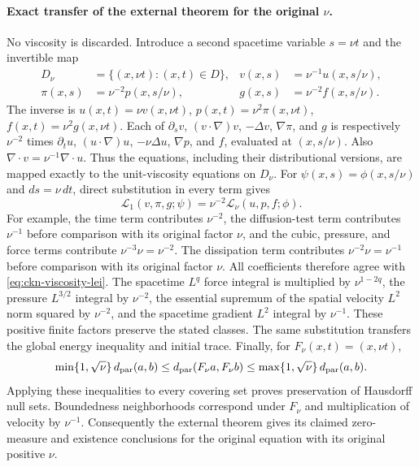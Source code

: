 \paragraph{Exact transfer of the external theorem for the original $\nu$.}
No viscosity is discarded. Introduce a second spacetime variable
$s=\nu t$ and the invertible map
\begin{equation}\label{eq:ckn-viscosity-map}
 \begin{aligned}
 D_\nu&=\{(x,\nu t):(x,t)\in D\},&
 v(x,s)&=\nu^{-1}u(x,s/\nu),\\
 \pi(x,s)&=\nu^{-2}p(x,s/\nu),&
 g(x,s)&=\nu^{-2}f(x,s/\nu).
 \end{aligned}
\end{equation}
The inverse is $u(x,t)=\nu v(x,\nu t)$,
$p(x,t)=\nu^2\pi(x,\nu t)$, $f(x,t)=\nu^2g(x,\nu t)$.
Each of $\partial_s v$, $(v\cdot\nabla)v$, $-\Delta v$,
$\nabla\pi$, and $g$ is respectively $\nu^{-2}$ times
$\partial_tu$, $(u\cdot\nabla)u$, $-\nu\Delta u$,
$\nabla p$, and $f$, evaluated at $(x,s/\nu)$. Also
$\nabla\cdot v=\nu^{-1}\nabla\cdot u$. Thus the equations,
including their distributional versions, are mapped exactly to the
unit-viscosity equations on $D_\nu$.
For $\psi(x,s)=\phi(x,s/\nu)$ and $ds=\nu\,dt$, direct substitution
in every term gives
\begin{equation}\label{eq:ckn-viscosity-lei}
 \mathcal L_1(v,\pi,g;\psi)
 =\nu^{-2}\mathcal L_\nu(u,p,f;\phi).
\end{equation}
For example, the time term contributes $\nu^{-2}$, the diffusion-test
term contributes $\nu^{-1}$ before comparison with its original factor
$\nu$, and the cubic, pressure, and force terms contribute
$\nu^{-3}\nu=\nu^{-2}$. The dissipation term contributes
$\nu^{-2}\nu=\nu^{-1}$ before comparison with its original factor
$\nu$. All coefficients therefore agree with
\eqref{eq:ckn-viscosity-lei}. The spacetime $L^q$ force integral is
multiplied by $\nu^{1-2q}$, the pressure $L^{3/2}$ integral by
$\nu^{-2}$, the essential supremum of the spatial velocity $L^2$
norm squared by $\nu^{-2}$, and the spacetime gradient $L^2$ integral
by $\nu^{-1}$. These positive finite factors preserve the stated classes.
The same substitution transfers the global energy inequality and initial
trace.
Finally, for $F_\nu(x,t)=(x,\nu t)$,
\begin{equation}\label{eq:ckn-metric-transfer}
 \min\{1,\sqrt\nu\}\,d_{\rm par}(a,b)
 \leq d_{\rm par}(F_\nu a,F_\nu b)
 \leq\max\{1,\sqrt\nu\}\,d_{\rm par}(a,b).
\end{equation}
Applying these inequalities to every covering set proves preservation of
Hausdorff null sets. Boundedness neighborhoods correspond under $F_\nu$
and multiplication of velocity by $\nu^{-1}$. Consequently the external
theorem gives its claimed zero-measure and existence conclusions for
the original equation with its original positive $\nu$.

